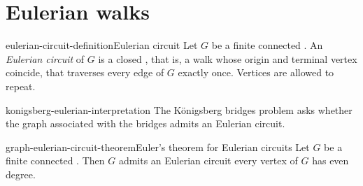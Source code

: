 \documentclass[preview]{standalone}
\begin{document}
\genpage

\section{Eulerian walks}

\begin{snippetdefinition}{eulerian-circuit-definition}{Eulerian circuit}
    Let \(G\) be a finite connected \graph.
    An \emph{Eulerian circuit} of \(G\) is a closed \walk, that is, a walk
    whose origin and terminal vertex coincide, that traverses every edge of
    \(G\) exactly once.
    Vertices are allowed to repeat.
\end{snippetdefinition}

\begin{snippet}{konigsberg-eulerian-interpretation}
    The Königsberg bridges problem asks whether the graph associated with the
    bridges admits an Eulerian circuit.
\end{snippet}

\begin{snippettheorem}{graph-eulerian-circuit-theorem}{Euler's theorem for Eulerian circuits}
    Let \(G\) be a finite connected \graph. Then \(G\) admits an Eulerian
    circuit \ifandonlyif every vertex of \(G\) has even degree.
\end{snippettheorem}
\end{document}
